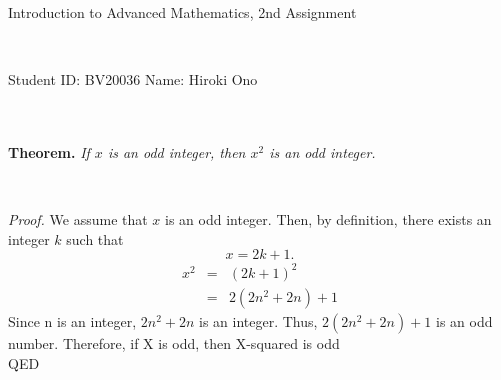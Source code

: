 \documentclass[12pt]{amsart}
\begin{document}
\begin{center}
    Introduction to Advanced Mathematics, 2nd Assignment
\end{center}

\

\begin{flushright}
\rm 
Student ID: {BV20036} \quad \quad
Name: {Hiroki Ono}
\end{flushright}
\ \\ \ \\

\noindent
{\bf Theorem.} {\it If $x$ is an odd integer, then $x^2$ is an odd integer.}

\

\noindent
{\it Proof.}  We assume that $x$ is an odd integer. Then, by definition, there exists an integer $k$ such that 
\[
x=2k+1.
\]
\begin{eqnarray*}
    x^2 &=& (2k+1)^2 \\
      &=& 2(2n^2+2n)+1
    \end{eqnarray*}
    Since n is an integer, $2n^2+2n$ is an integer. Thus, $2(2n^2+2n)+1$ is an odd number.
    Therefore, if X is odd, then X-squared is odd\\
\hfill QED
\end{document}
